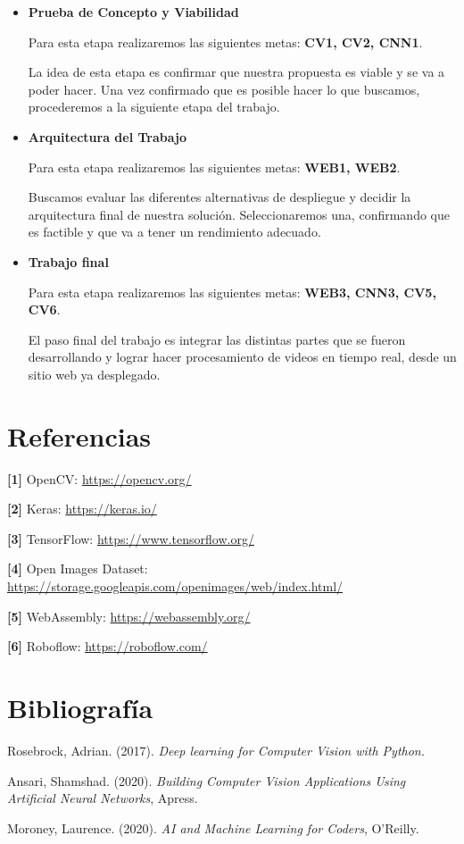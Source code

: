 \documentclass[a4paper]{article}
\begin{document}
\begin{itemize}
\item \textbf{Prueba de Concepto y Viabilidad}

Para esta etapa realizaremos las siguientes metas: \textbf{CV1, CV2, CNN1}.

La idea de esta etapa es confirmar que nuestra propuesta es viable y se va a poder hacer. Una vez confirmado que es posible hacer lo que buscamos, procederemos a la siguiente etapa del trabajo.

\item \textbf{Arquitectura del Trabajo}

Para esta etapa realizaremos las siguientes metas: \textbf{WEB1, WEB2}.

Buscamos evaluar las diferentes alternativas de despliegue y decidir la arquitectura final de nuestra solución.
Seleccionaremos una, confirmando que es factible y que va a tener un rendimiento adecuado.

\item \textbf{Trabajo final}

Para esta etapa realizaremos las siguientes metas: \textbf{WEB3, CNN3, CV5, CV6}.

El paso final del trabajo es integrar las distintas partes que se fueron desarrollando y lograr hacer procesamiento de videos en tiempo real, desde un sitio web ya desplegado.

\end{itemize}

\setcounter{secnumdepth}{0}
\doublespacing

\section{Referencias}

\textbf{[1]} OpenCV: \url{https://opencv.org/}

\textbf{[2]} Keras: \url{https://keras.io/}

\textbf{[3]} TensorFlow: \url{https://www.tensorflow.org/}

\textbf{[4]} Open Images Dataset: \url{https://storage.googleapis.com/openimages/web/index.html/}

\textbf{[5]} WebAssembly: \url{https://webassembly.org/}

\textbf{[6]} Roboflow: \url{https://roboflow.com/}

\section{Bibliografía}

Rosebrock, Adrian. (2017). \textit{Deep learning for Computer Vision with Python.}

Ansari, Shamshad. (2020). \textit{Building Computer Vision Applications Using Artificial Neural Networks}, Apress.

Moroney, Laurence. (2020). \textit{AI and Machine Learning for Coders}, O'Reilly.
\end{document}
